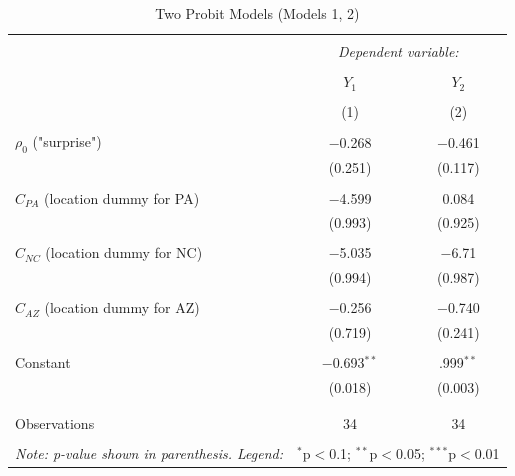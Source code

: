 \documentclass[Journal,letterpaper, NoLineNumbers]{ascelike-new}
\begin{document}
\begin{table}[!htbp] \centering 
  \caption{Two Probit Models (Models 1, 2)} 
  \label{} 
\begin{tabular}{@{\extracolsep{5pt}}lcc} 
\\[-1.8ex]\hline 
\hline \\[-1.8ex] 
 & \multicolumn{2}{c}{\textit{Dependent variable:}} \\ 
\cline{2-3} 
\\[-1.8ex] & $Y_1$ & $Y_2$ \\ 
\\[-1.8ex] & (1) & (2)\\ 
\hline \\[-1.8ex] 
 $\rho_0$ ("surprise") & $-$0.268 & $-$0.461 \\ 
  & (0.251) & (0.117) \\ 
  & & \\ 
 $C_{PA}$ (location dummy for PA)& $-$4.599 & $ $0.084 \\ 
  & (0.993) & (0.925) \\ 
  & & \\ 
 $C_{NC}$ (location dummy for NC)& $-$5.035 & $-$6.71 \\ 
  & (0.994) & (0.987) \\ 
  & & \\ 
 $C_{AZ}$ (location dummy for AZ)& $-$0.256 & $-$0.740 \\ 
  & (0.719) & (0.241) \\ 
  & & \\ 
 Constant & $-$0.693$^{**}$ & .999$^{**}$ \\ 
  & (0.018) & (0.003) \\ 
  & & \\ 
\hline \\[-1.8ex] 
Observations & 34 & 34 \\ 
\hline 
\hline \\[-1.8ex] 
\textit{Note: p-value shown in parenthesis. Legend: }  & \multicolumn{2}{r}{$^{*}$p$<$0.1; $^{**}$p$<$0.05; $^{***}$p$<$0.01} \\ 
\end{tabular} 
\end{table} 
\end{document}
